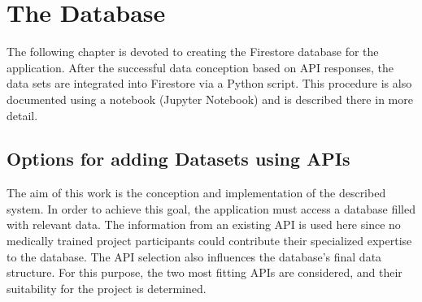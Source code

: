 
\chapter{The Database}
The following chapter is devoted to creating the Firestore database for the application. After the successful data conception based on API responses, the data sets are integrated into Firestore via a Python script. This procedure is also documented using a notebook (Jupyter Notebook) and is described there in more detail.

\section{Options for adding Datasets using APIs}
The aim of this work is the conception and implementation of the described system. In order to achieve this goal, the application must access a database filled with relevant data. The information from an existing API is used here since no medically trained project participants could contribute their specialized expertise to the database. The API selection also influences the database's final data structure. For this purpose, the two most fitting APIs are considered, and their suitability for the project is determined.

